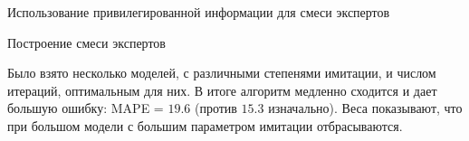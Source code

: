 \documentclass{beamer}
\begin{document}
\begin{frame}{Использование привилегированной информации для смеси экспертов}

\begin{figure}[!htb]
\end{figure}



\end{frame}


\begin{frame}{Построение смеси экспертов}

Было взято несколько моделей, с различными степенями имитации, и числом итераций, оптимальным для них. В итоге алгоритм медленно сходится и дает большую ошибку:  MAPE = $19.6$ (против $15.3$ изначально). Веса показывают, что при большом модели с большим параметром имитации отбрасываются.   

\end{frame}
\end{document}
